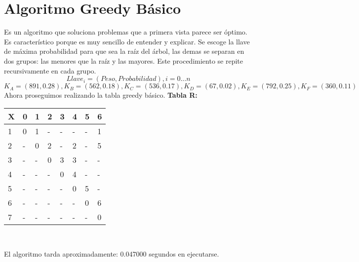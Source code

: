 \documentclass[10pt,letterpaper]{article}
\begin{document}
\section{Algoritmo Greedy Básico} 
        Es un algoritmo que soluciona problemas que a primera vista parece ser 
        óptimo. Es característico porque es muy sencillo de entender y explicar. 
        Se escoge la llave de máxima probabilidad para que sea la raíz del árbol, las 
        demas se separan en dos grupos: las menores que la raíz y las mayores. Este 
        procedimiento se repite recursivamente en cada grupo. 
        \[ Llave_{i} = (Peso, Probabilidad), i = 0...n \]
\[ K_{A} = (891, 0.28), K_{B} = (562, 0.18), K_{C} = (536, 0.17), K_{D} = (67, 0.02), K_{E} = (792, 0.25), K_{F} = (360, 0.11) \]
\newline Ahora proseguimos realizando la tabla greedy básico.
\textbf{Tabla R: }
\begin{center}
\begin{tabu} to 1.0\textwidth { | l | l | l | l | l | l | l | l | }
\hline
{}\color{black}\textbf{X} & \color{black}\textbf{0} & \color{black}\textbf{1} & \color{black}\textbf{2} & \color{black}\textbf{3} & \color{black}\textbf{4} & \color{black}\textbf{5} & \color{black}\textbf{6} \\ 
\hline
{}\color{black}1 &  0  &  1  &  -  &  -  &  -  &  -  &  1  \\ 
\hline
{}\color{black}2 &  -  &  0  &  2  &  -  &  2  &  -  &  5  \\ 
\hline
{}\color{black}3 &  -  &  -  &  0  &  3  &  3  &  -  &  -  \\ 
\hline
{}\color{black}4 &  -  &  -  &  -  &  0  &  4  &  -  &  -  \\ 
\hline
{}\color{black}5 &  -  &  -  &  -  &  -  &  0  &  5  &  -  \\ 
\hline
{}\color{black}6 &  -  &  -  &  -  &  -  &  -  &  0  &  6  \\ 
\hline
{}\color{black}7 &  -  &  -  &  -  &  -  &  -  &  -  &  0  \\ 
\hline
\end{tabu} \\
\end{center}
El algoritmo tarda aproximadamente: 0.047000 segundos en ejecutarse.
\end{document}
